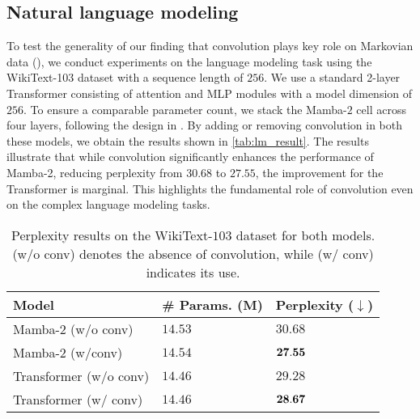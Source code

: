 \subsection{Natural language modeling}
\label{sec:english}
To test the generality of our finding that convolution plays key role on Markovian data (), we conduct experiments on the language modeling task using the WikiText-103 dataset with a sequence length of $256$. We use a standard 2-layer Transformer consisting of attention and MLP modules with a model dimension of $256$. To ensure a comparable parameter count, we stack the Mamba-$2$ cell across four layers, following the design in \cite{dao2024transformers}. By adding or removing convolution in both these models, we obtain the results shown in \autoref{tab:lm_result}. The results illustrate that while convolution significantly enhances the performance of Mamba-2, reducing perplexity from $30.68$ to $27.55$, the improvement for the Transformer is marginal. This highlights the fundamental role of convolution even on the complex language modeling tasks. 

\begin{table}[h]
\centering
\caption{Perplexity results on the WikiText-$103$ dataset for both models. (w/o conv) denotes the absence of convolution, while (w/ conv) indicates its use.}
\begin{tabular}{lll}
\toprule
\bf Model & \bf \# Params. (M) &\bf Perplexity ($\downarrow$)\\
\midrule
Mamba-$2$ (w/o conv)& $ 14.53 $ & $ 30.68 $ \\ 
Mamba-$2$ (w/conv)& $14.54$ &  $\bf{27.55}$ \\
\midrule
Transformer (w/o conv) & $14.46$ & $29.28$ \\
Transformer (w/ conv) & $14.46$ &  $\bf{28.67}$  \\
\bottomrule
\end{tabular}
\label{tab:lm_result}
\end{table}

